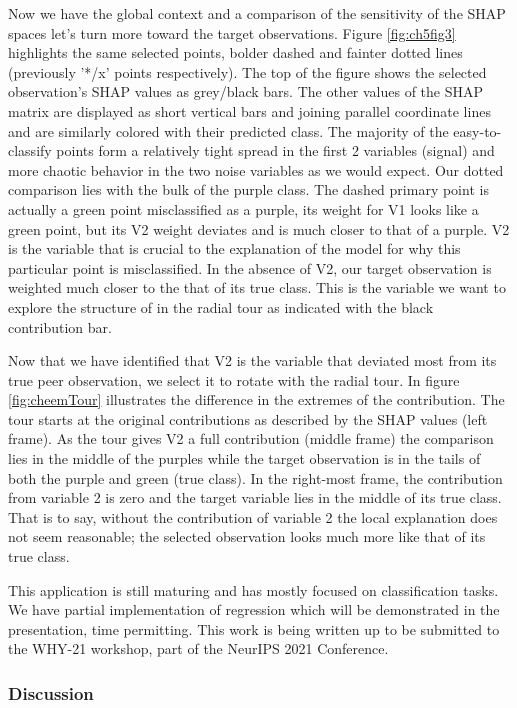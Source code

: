\documentclass{template/monashthesis}
\begin{document}
Now we have the global context and a comparison of the sensitivity of the SHAP spaces let's turn more toward the target observations. Figure \ref{fig:ch5fig3} highlights the same selected points, bolder dashed and fainter dotted lines (previously '*/x' points respectively). The top of the figure shows the selected observation's SHAP values as grey/black bars. The other values of the SHAP matrix are displayed as short vertical bars and joining parallel coordinate lines and are similarly colored with their predicted class. The majority of the easy-to-classify points form a relatively tight spread in the first 2 variables (signal) and more chaotic behavior in the two noise variables as we would expect. Our dotted comparison lies with the bulk of the purple class. The dashed primary point is actually a green point misclassified as a purple, its weight for V1 looks like a green point, but its V2 weight deviates and is much closer to that of a purple. V2 is the variable that is crucial to the explanation of the model for why this particular point is misclassified. In the absence of V2, our target observation is weighted much closer to the that of its true class. This is the variable we want to explore the structure of in the radial tour as indicated with the black contribution bar.

Now that we have identified that V2 is the variable that deviated most from its true peer observation, we select it to rotate with the radial tour. In figure \ref{fig:cheemTour} illustrates the difference in the extremes of the contribution. The tour starts at the original contributions as described by the SHAP values (left frame). As the tour gives V2 a full contribution (middle frame) the comparison lies in the middle of the purples while the target observation is in the tails of both the purple and green (true class). In the right-most frame, the contribution from variable 2 is zero and the target variable lies in the middle of its true class. That is to say, without the contribution of variable 2 the local explanation does not seem reasonable; the selected observation looks much more like that of its true class.

This application is still maturing and has mostly focused on classification tasks. We have partial implementation of regression which will be demonstrated in the presentation, time permitting. This work is being written up to be submitted to the WHY-21 workshop, part of the NeurIPS 2021 Conference.

\hypertarget{discussion}{%
\subsubsection{Discussion}\label{discussion}}
\end{document}
